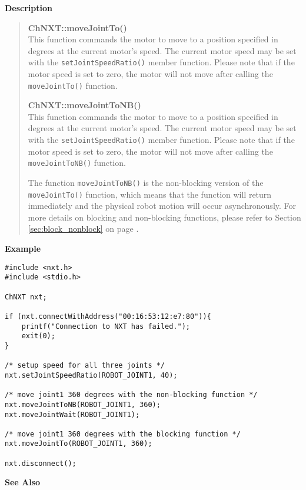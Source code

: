 \noindent
{\bf Description}\\
\vspace{-12pt}
\begin{quote}
{\bf ChNXT::moveJointTo()}\\
This function commands the motor to move to a position specified 
in degrees at the current motor's speed. The current motor speed 
may be set with the \texttt{setJointSpeedRatio()} member function.
Please note that if the motor speed is set to zero, the motor will
not move after calling the \texttt{moveJointTo()} function. 

{\bf ChNXT::moveJointToNB()}\\
This function commands the motor to move to a position specified 
in degrees at the current motor's speed. The current motor speed 
may be set with the \texttt{setJointSpeedRatio()} member function.
Please note that if the motor speed is set to zero, the motor will
not move after calling the \texttt{moveJointToNB()} function. 

The function \texttt{moveJointToNB()} is the non-blocking version 
of the \texttt{moveJointTo()} function, which means that the 
function will return immediately and the physical robot motion 
will occur asynchronously. For more details on blocking and 
non-blocking functions, please refer to Section \ref{sec:block_nonblock}
on page \pageref{sec:block_nonblock}.\\
\end{quote}

\noindent
{\bf Example}
\begin{verbatim}
#include <nxt.h> 
#include <stdio.h>

ChNXT nxt;

if (nxt.connectWithAddress("00:16:53:12:e7:80")){
    printf("Connection to NXT has failed.");
    exit(0);
}
 
/* setup speed for all three joints */
nxt.setJointSpeedRatio(ROBOT_JOINT1, 40);

/* move joint1 360 degrees with the non-blocking function */
nxt.moveJointToNB(ROBOT_JOINT1, 360);
nxt.moveJointWait(ROBOT_JOINT1);

/* move joint1 360 degrees with the blocking function */
nxt.moveJointTo(ROBOT_JOINT1, 360);

nxt.disconnect();
\end{verbatim}

\noindent
{\bf See Also}\\
